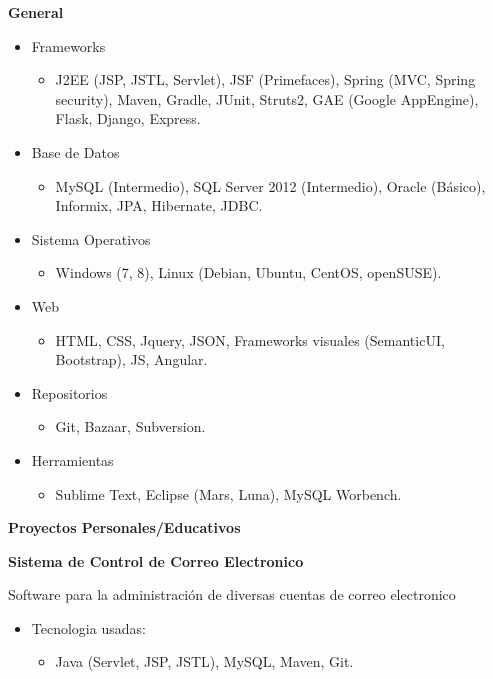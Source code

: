 \documentclass[a4paper,12pt,final]{memoir}
\newcommand{\SmallSep}{\vspace{0.5em}}
\newcommand{\CVSection}[1]
	{\Large\textbf{#1}\par
	\SmallSep\normalsize\normalfont}
\newcommand{\CVItem}[1]
	{\textbf{\color{RoyalBlue} #1}}
\begin{document}
\CVItem{General}{
\begin{itemize}[noitemsep]
  \item Frameworks
  \begin{itemize}
    \item J2EE (JSP, JSTL, Servlet),
          JSF (Primefaces),
          Spring (MVC, Spring security),
          Maven, Gradle, JUnit, Struts2, GAE (Google AppEngine),
          Flask, Django, Express.
  \end{itemize}
  \item Base de Datos
  \begin{itemize}
    \item MySQL (Intermedio), SQL Server 2012 (Intermedio), Oracle (Básico), Informix, JPA, Hibernate, JDBC.
  \end{itemize}
  \item Sistema Operativos
  \begin{itemize}
    \item Windows (7, 8), Linux (Debian, Ubuntu, CentOS, openSUSE).
  \end{itemize}
  \item Web
  \begin{itemize}
    \item HTML, CSS, Jquery, JSON, Frameworks visuales (SemanticUI, Bootstrap), JS, Angular.
  \end{itemize}
  \item Repositorios
  \begin{itemize}
    \item Git, Bazaar, Subversion.
  \end{itemize}
  \item Herramientas
  \begin{itemize}
    \item Sublime Text, Eclipse (Mars, Luna), MySQL Worbench.
  \end{itemize}
\end{itemize}
}



\CVSection{Proyectos Personales/Educativos}


\CVItem{Sistema de Control de Correo Electronico}{
Software para la administración de diversas cuentas de correo electronico
\begin{itemize}[noitemsep]
  \item Tecnologia usadas:
  \begin{itemize}
    \item Java (Servlet, JSP, JSTL), MySQL, Maven, Git.
  \end{itemize}
\end{itemize}
}
\end{document}
